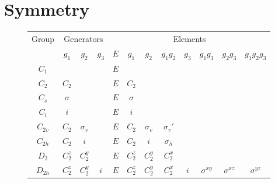 
\section{Symmetry}

\begin{figure}[h]
\caption{\label{fig:symmetry-symbol}}
\begin{tabular}{c|ccc|cccccccc|}
Group &
\multicolumn{3}{c}{Generators} &
\multicolumn{8}{c}{Elements} \\
         & $g_1$    & $g_2$      & $g_3$ & $E$ &  $g_1$ & $g_2$ & $g_1g_2$ & $g_3$ & $g_1g_3$ & $g_2g_3$ & $g_1g_2g_3$ \\
$C_1$    &          &            &       & $E$ &        &       &          &      &      &      &     \\
$C_2$    & $C_2$    &            &       & $E$ & $C_2$  &       &          &      &      &      &     \\
$C_s$    & $\sigma$ &            &       & $E$ & $\sigma$ &       &          &      &      &      &     \\
$C_i$    & $i$      &            &       & $E$ & $i$    &       &          &      &      &      &     \\
$C_{2v}$ & $C_2$    & $\sigma_v$ &       & $E$ & $C_2$  & $\sigma_v$ & $\sigma_v'$ &  &  &  & \\
$C_{2h}$ & $C_2$    & $i$        &       & $E$ & $C_2$  & $i$ & $\sigma_h$ &       &      &      &     \\
$D_2$    & $C_2^z$  & $C_2^y$    &       & $E$ & $C_2^z$ & $C_2^y$ & $C_2^x$ &      &      &      &     \\
$D_{2h}$ & $C_2^z$  & $C_2^y$    & $i$   & $E$ & $C_2^z$ & $C_2^y$ & $C_2^x$ & $i$ & $\sigma^{xy}$ & $\sigma^{xz}$ & $\sigma^{yz}$ \\
\end{tabular}
\end{figure}

